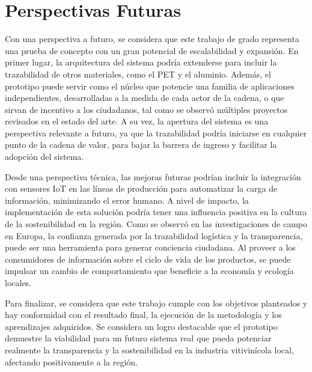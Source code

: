 \section{Perspectivas Futuras}

Con una perspectiva a futuro, se considera que este trabajo de grado representa una prueba de concepto con un gran potencial de escalabilidad y expansión. En primer lugar, la arquitectura del sistema podría extenderse para incluir la trazabilidad de otros materiales, como el PET y el aluminio. Además, el prototipo puede servir como el núcleo que potencie una familia de aplicaciones independientes, desarrolladas a la medida de cada actor de la cadena, o que sirvan de incentivo a los ciudadanos, tal como se observó múltiples proyectos revisados en el estado del arte. A su vez, la apertura del sistema es una perspectiva relevante a futuro, ya que la trazabilidad podría iniciarse en cualquier punto de la cadena de valor, para bajar la barrera de ingreso y facilitar la adopción del sistema.

Desde una perspectiva técnica, las mejoras futuras podrían incluir la integración con sensores IoT en las líneas de producción para automatizar la carga de información, minimizando el error humano. A nivel de impacto, la implementación de esta solución podría tener una influencia positiva en la cultura de la sostenibilidad en la región. Como se observó en las investigaciones de campo en Europa, la confianza generada por la trazabilidad logística y la transparencia, puede ser una herramienta para generar conciencia ciudadana. Al proveer a los consumidores de información sobre el ciclo de vida de los productos, se puede impulsar un cambio de comportamiento que beneficie a la economía y ecología locales.

Para finalizar, se considera que este trabajo cumple con los objetivos planteados y hay conformidad con el resultado final, la ejecución de la metodología y los aprendizajes adquiridos. Se considera un logro destacable que el prototipo demuestre la viabilidad para un futuro sistema real que pueda potenciar realmente la transparencia y la sostenibilidad en la industria vitivinícola local, afectando positivamente a la región.
